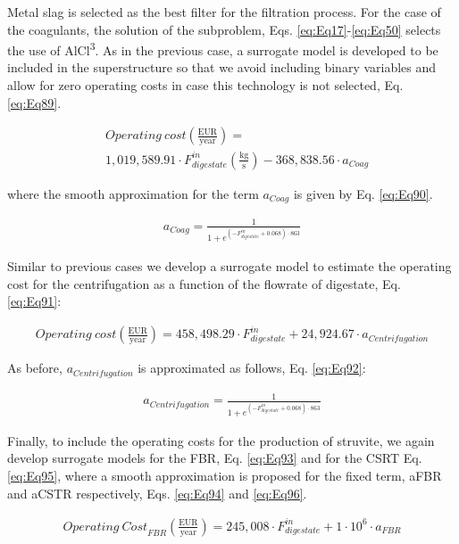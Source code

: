 \begin{refsection}[referencesCh2]
Metal slag is selected as the best filter for the filtration process. For the case of the coagulants, the solution of the subproblem, Eqs. \ref{eq:Eq17}-\ref{eq:Eq50} selects the use of AlCl\textsuperscript{3}. As in the previous case, a surrogate model is developed to be included in the superstructure so that we avoid including binary variables and allow for zero operating costs in case this technology is not selected, Eq. \ref{eq:Eq89}.

\begin{align}
	& {Operating \ cost} \left( \frac{\text{EUR}}{\text{year}} \right) = \label{eq:Eq89} \\
	& 1,019,589.91 \cdot F_{digestate}^{in} \left( \frac{\text{kg}}{\text{s}} \right) -368,838.56 \cdot {a}_{Coag} \nonumber
\end{align}

where the smooth approximation for the term ${a}_{Coag}$ is given by Eq. \ref{eq:Eq90}.

\begin{align}
	{a}_{Coag} = \frac{1}{1 + e^{\left( -F_{digestate}^{in} + 0.068 \right) \cdot 863}} \label{eq:Eq90}
\end{align}

Similar to previous cases we develop a surrogate model to estimate the operating cost for the centrifugation as a function of the flowrate of digestate, Eq. \ref{eq:Eq91}:

\begin{align}
	{Operating \ cost} \left( \frac{\text{EUR}}{\text{year}} \right) = 458,498.29 \cdot F_{digestate}^{in} +  24,924.67 \cdot {a}_{Centrifugation} \label{eq:Eq91}
\end{align}

As before, ${a}_{Centrifugation}$ is approximated as follows, Eq. \ref{eq:Eq92}:

\begin{align}
	{a}_{Centrifugation} = \frac{1}{1 + e^{\left( { - F_{digestate}^{in} + 0.068} \right) \cdot 863}} \label{eq:Eq92}
\end{align}

Finally, to include the operating costs for the production of struvite, we again develop surrogate models for the FBR, Eq. \ref{eq:Eq93} and for the CSRT Eq. \ref{eq:Eq95}, where a smooth approximation is proposed for the fixed term, aFBR and aCSTR respectively, Eqs. \ref{eq:Eq94} and \ref{eq:Eq96}.

\begin{align}
	{Operating \ Cost}_{FBR} \left( \frac{\text{EUR}}{\text{year}} \right) = 245,008 \cdot F_{digestate}^{in} +  1 \cdot {10^6} \cdot {a}_{FBR} \label{eq:Eq93}
\end{align}


\end{refsection}
